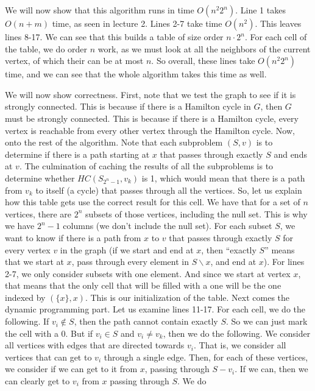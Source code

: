 \documentclass{article}
\begin{document}
\vspace{5mm}
We will now show that this algorithm runs in time $O(n^2 2^n)$. Line 1 takes
$O(n+m)$ time, as seen in lecture 2. Lines 2-7 take time $O(n^2)$. This leaves
lines 8-17. We can see that this builds a table of size order $n \cdot 2^n$. For
each cell of the table, we do order $n$ work, as we must look at all the
neighbors of the current vertex, of which their can be at most $n$. So overall,
these lines take $O(n^2 2^n)$ time, and we can see that the whole algorithm
takes this time as well.

We will now show correctness. First, note that we test the graph to see
if it is strongly connected. This is because if there is a Hamilton cycle in
$G$, then $G$ must be strongly connected. This is because if there is a
Hamilton cycle, every vertex is reachable from every other vertex through the
Hamilton cycle. Now, onto the rest of the algorithm. Note that each subproblem $(S,v)$ is to determine
if there is a path starting at $x$ that passes through exactly $S$ and ends at
$v$. The culmination of caching the results of all the subproblems is to
determine whether $HC(S_{2^n - 1},v_k)$ is 1, which would mean that there is a path
from $v_k$ to itself (a cycle) that passes through all the vertices. So, let us
explain how this table gets use the correct result for this cell. We have that
for a set of $n$ vertices, there are $2^n$ subsets of those vertices, including
the null set. This is why we have $2^n - 1$ columns (we don't include the null
set). For each subset $S$, we want to know if there is a path from $x$ to $v$ that
passes through exactly $S$ for every vertex $v$ in the graph (if we start and
end at $x$, then ``exactly $S$'' means that we start at $x$, pass through every
element in $S \backslash x$, and end at $x$). For lines 2-7, we only consider
subsets with one element. And since we start at vertex $x$, that means that the
only cell that will be filled with a one will be the one indexed by $(\{x\},
x)$. This is our initialization of the table. Next comes the dynamic programming
part. Let us examine lines 11-17. For each cell, we do the following. If $v_i
\notin S$, then the path cannot contain exactly $S$. So we can just mark the
cell with a 0. But if $v_i \in S$ and $v_i \neq v_k$, then we do the following. We consider all
vertices with edges that are directed towards $v_i$. That is, we consider all
vertices that can get to $v_i$ through a single edge. Then, for each of these
vertices, we consider if we can get to it from $x$, passing through $S-v_i$. If
we can, then we can clearly get to $v_i$ from $x$ passing through $S$. We do
\end{document}
